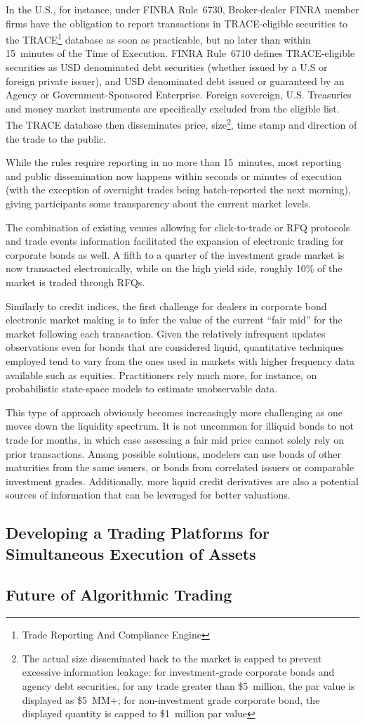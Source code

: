 In the U.S., for instance, under FINRA Rule~6730, Broker-dealer FINRA member firms have the obligation to report transactions in TRACE-eligible securities to the TRACE\footnote{Trade Reporting And Compliance Engine} database as soon as practicable, but no later than within 15~minutes of the Time of Execution. FINRA Rule~6710 defines TRACE-eligible securities as USD denominated debt securities (whether issued by a U.S or foreign private issuer), and USD denominated debt issued or guaranteed by an Agency or Government-Sponsored Enterprise. Foreign sovereign, U.S. Treasuries and money market instruments are specifically excluded from the eligible list. The TRACE database then disseminates price, size\footnote{The actual size disseminated back to the market is capped to prevent excessive information leakage: for investment-grade corporate bonds and agency debt securities, for any trade greater than \$5~million, the par value is displayed as \$5~MM$+$; for non-investment grade corporate bond, the displayed quantity is capped to \$1~million par value}, time stamp and direction of the trade to the public.


While the rules require reporting in no more than 15~minutes, most reporting and public dissemination now happens within seconds or minutes of execution (with the exception of overnight trades being batch-reported the next morning), giving participants some transparency about the current market levels.


The combination of existing venues allowing for click-to-trade or RFQ protocols and trade events information facilitated the expansion of electronic trading for corporate bonds as well. A fifth to a quarter of the investment grade market is now transacted electronically, while on the high yield side, roughly 10\% of the market is traded through RFQs.


Similarly to credit indices, the first challenge for dealers in corporate bond electronic market making is to infer the value of the current ``fair mid'' for the market following each transaction. Given the relatively infrequent updates observations even for bonds that are considered liquid, quantitative techniques employed tend to vary from the ones used in markets with higher frequency data available such as equities. Practitioners rely much more, for instance, on probabilistic state-space models to estimate unobservable data.


This type of approach obviously becomes increasingly more challenging as one moves down the liquidity spectrum. It is not uncommon for illiquid bonds to not trade for months, in which case assessing a fair mid price cannot solely rely on prior transactions. Among possible solutions, modelers can use bonds of other maturities from the same issuers, or bonds from correlated issuers or comparable investment grades. Additionally, more liquid credit derivatives are also a potential sources of information that can be leveraged for better valuations.\\



\subsection{Developing a Trading Platforms for Simultaneous Execution of Assets}
\subsection{Future of Algorithmic Trading}